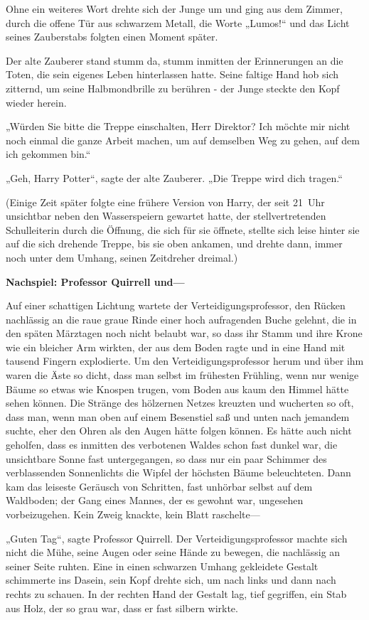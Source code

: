 {Ohne ein weiteres Wort drehte sich der Junge um und ging aus dem Zimmer, durch die offene Tür aus schwarzem Metall, die Worte „Lumos!“ und das Licht seines Zauberstabs folgten einen Moment später.

Der alte Zauberer stand stumm da, stumm inmitten der Erinnerungen an die Toten, die sein eigenes Leben hinterlassen hatte. Seine faltige Hand hob sich zitternd, um seine Halbmondbrille zu berühren - der Junge steckte den Kopf wieder herein.

„Würden Sie bitte die Treppe einschalten, Herr Direktor? Ich möchte mir nicht noch einmal die ganze Arbeit machen, um auf demselben Weg zu gehen, auf dem ich gekommen bin.“

„Geh, Harry Potter“, sagte der alte Zauberer. „Die Treppe wird dich tragen.“

(Einige Zeit später folgte eine frühere Version von Harry, der seit 21~Uhr unsichtbar neben den Wasserspeiern gewartet hatte, der stellvertretenden Schulleiterin durch die Öffnung, die sich für sie öffnete, stellte sich leise hinter sie auf die sich drehende Treppe, bis sie oben ankamen, und drehte dann, immer noch unter dem Umhang, seinen Zeitdreher dreimal.)

\textbf{Nachspiel: Professor Quirrell und—}

Auf einer schattigen Lichtung wartete der Verteidigungsprofessor, den Rücken nachlässig an die raue graue Rinde einer hoch aufragenden Buche gelehnt, die in den späten Märztagen noch nicht belaubt war, so dass ihr Stamm und ihre Krone wie ein bleicher Arm wirkten, der aus dem Boden ragte und in eine Hand mit tausend Fingern explodierte. Um den Verteidigungsprofessor herum und über ihm waren die Äste so dicht, dass man selbst im frühesten Frühling, wenn nur wenige Bäume so etwas wie Knospen trugen, vom Boden aus kaum den Himmel hätte sehen können. Die Stränge des hölzernen Netzes kreuzten und wucherten so oft, dass man, wenn man oben auf einem Besenstiel saß und unten nach jemandem suchte, eher den Ohren als den Augen hätte folgen können. Es hätte auch nicht geholfen, dass es inmitten des verbotenen Waldes schon fast dunkel war, die unsichtbare Sonne fast untergegangen, so dass nur ein paar Schimmer des verblassenden Sonnenlichts die Wipfel der höchsten Bäume beleuchteten. Dann kam das leiseste Geräusch von Schritten, fast unhörbar selbst auf dem Waldboden; der Gang eines Mannes, der es gewohnt war, ungesehen vorbeizugehen. Kein Zweig knackte, kein Blatt raschelte—

„Guten Tag“, sagte Professor Quirrell. Der Verteidigungsprofessor machte sich nicht die Mühe, seine Augen oder seine Hände zu bewegen, die nachlässig an seiner Seite ruhten. Eine in einen schwarzen Umhang gekleidete Gestalt schimmerte ins Dasein, sein Kopf drehte sich, um nach links und dann nach rechts zu schauen. In der rechten Hand der Gestalt lag, tief gegriffen, ein Stab aus Holz, der so grau war, dass er fast silbern wirkte.

}
